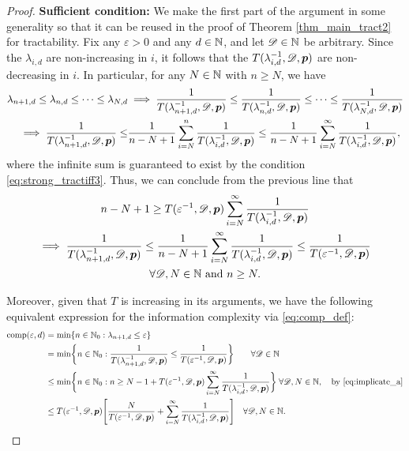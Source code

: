 \documentclass[sort&compress]{elsarticle}
\newcommand{\thed}{\mathscr{D}}
\begin{document}
\begin{proof}
\textbf{Sufficient condition:}\newline
We make the first part of the argument in some generality so that it can be reused in the proof of Theorem \ref{thm_main_tract2} for tractability.  Fix any $\varepsilon > 0$ and any $d \in \mathbb{N}$, and let $\thed \in \naturals$ be arbitrary. %
Since the $\lambda_{i,d}$ are non-increasing in $i$, it follows that the $T(\lambda_{i,d}^{-1},\thed,\vp)$ are non-decreasing in $i$. In particular, for  any $N\in\mathbb{N}$ with $n\ge N$, we have
\begin{align*}
    \lambda_{n+1,d} \le \lambda_{n,d} \le \cdots \le \lambda_{N,d}
    & \implies \frac{1}{T(\lambda_{n+1, d}^{-1},\thed,\vp)} \le \frac{1}{T(\lambda_{n, d}^{-1},\thed,\vp)} \le \cdots \le \frac{1}{T(\lambda_{N, d}^{-1},\thed,\vp)} \\
     \implies \frac{1}{T(\lambda_{n+1, d}^{-1},\thed,\vp) }
    \le &\frac{1}{n-N+1} \sum_{i=N}^n  \frac{1}{T(\lambda_{i, d}^{-1},\thed,\vp) }
    \le \frac{1}{n-N+1} \sum_{i=N}^\infty  \frac{1}{T(\lambda_{i, d}^{-1},\thed,\vp)},
\end{align*}
where the infinite sum is guaranteed to exist by the condition \eqref{eq:strong_tractiff3}.
Thus, we can conclude from the previous line that
\begin{multline} \label{eq:implicate_a}
    n - N +1 \ge T(\varepsilon^{-1},\thed,\vp) \sum_{i=N}^\infty \frac{1}{T(\lambda_{i, d}^{-1},\thed,\vp)} \\
   \implies   \frac{1}{T(\lambda_{n+1, d}^{-1},\thed,\vp)} \le
   \frac{1}{n-N+1} \sum_{i=N}^\infty \frac{1}{T(\lambda_{i, d}^{-1},\thed,\vp) } \le \frac{1}{T(\varepsilon^{-1},\thed,\vp)} \\ \forall \thed, N \in \naturals\ \mbox{and}\ n\ge N.
\end{multline}

Moreover, given that $T$ is increasing in its arguments, we have the following equivalent expression for the information complexity via \eqref{eq:comp_def}:
\begin{align} %
	\nonumber
	\comp(\varepsilon, d) & = \min \{n \in \natzero : \lambda_{n+1, d} \le \varepsilon\} \\
	\nonumber
	& = \min \biggl\{n \in \natzero : \frac{1}{T(\lambda_{n+1,d}^{-1},\thed,\vp)}\le \frac{1}{T(\varepsilon^{-1},\thed,\vp) }\biggr\} \qquad  \forall \thed\in \naturals\\
	\nonumber
	& \le  \min \biggl\{n \in \natzero : n \ge N - 1 + T(\varepsilon^{-1},\thed,\vp) \sum_{i=N}^\infty \frac{1}{T(\lambda_{i, d}^{-1},\thed,\vp)} \biggr\} \;  \forall  \thed, N \in \naturals, \quad \text{by \eqref{eq:implicate_a}} \\
	& \le  T(\varepsilon^{-1},\thed,\vp) \Biggl [\frac{N}{T(\varepsilon^{-1},\thed,\vp)}  +  \sum_{i=N}^\infty \frac{1}{T(\lambda_{i, d}^{-1},\thed,\vp)} \Biggr] \quad \forall  \thed, N \in \naturals. \label{eq:compUP}
\end{align}


\end{proof}
\end{document}

